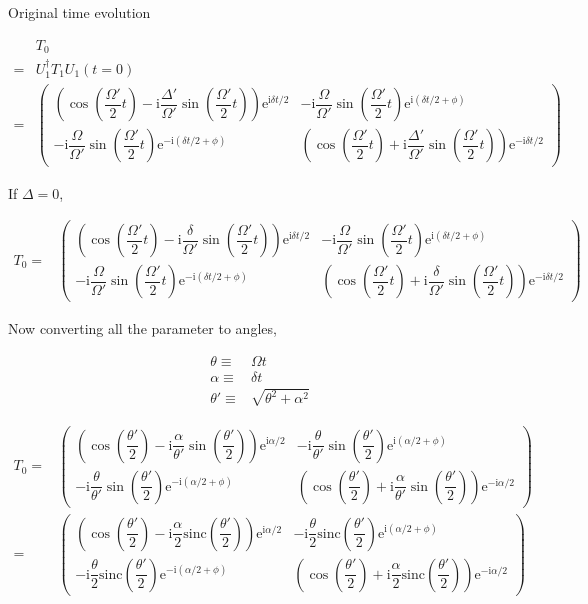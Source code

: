 \documentclass[10pt,fleqn]{article}
\newcommand{\ue}{\mathrm{e}}
\newcommand{\ui}{\mathrm{i}}
\newcommand{\eqar}[1]
{
  \begin{align*}
    #1
  \end{align*}
}
\newcommand{\paren}[1]{{\left({#1}\right)}}
\begin{document}
Original time evolution
\eqar{
  &T_0\\
  =&U_1^\dagger T_1 U_1(t=0)\\
  =&\begin{pmatrix}
    \paren{\cos\paren{\dfrac{\Omega'}{2}t}-\ui\dfrac{\Delta'}{\Omega'}\sin\paren{\dfrac{\Omega'}{2}t}}\ue^{\ui\delta t/2}
    &-\ui\dfrac{\Omega}{\Omega'}\sin\paren{\dfrac{\Omega'}{2}t}\ue^{\ui\paren{\delta t/2 + \phi}}\\
    -\ui\dfrac{\Omega}{\Omega'}\sin\paren{\dfrac{\Omega'}{2}t}\ue^{-\ui\paren{\delta t/2 + \phi}}
    &\paren{\cos\paren{\dfrac{\Omega'}{2}t}+\ui\dfrac{\Delta'}{\Omega'}\sin\paren{\dfrac{\Omega'}{2}t}}\ue^{-\ui\delta t/2}
  \end{pmatrix}
}

If $\Delta=0$,
\eqar{
  T_0=&\begin{pmatrix}
    \paren{\cos\paren{\dfrac{\Omega'}{2}t}-\ui\dfrac{\delta}{\Omega'}\sin\paren{\dfrac{\Omega'}{2}t}}\ue^{\ui\delta t/2}
    &-\ui\dfrac{\Omega}{\Omega'}\sin\paren{\dfrac{\Omega'}{2}t}\ue^{\ui\paren{\delta t/2 + \phi}}\\
    -\ui\dfrac{\Omega}{\Omega'}\sin\paren{\dfrac{\Omega'}{2}t}\ue^{-\ui\paren{\delta t/2 + \phi}}
    &\paren{\cos\paren{\dfrac{\Omega'}{2}t}+\ui\dfrac{\delta}{\Omega'}\sin\paren{\dfrac{\Omega'}{2}t}}\ue^{-\ui\delta t/2}
  \end{pmatrix}
}
Now converting all the parameter to angles,
\eqar{
  \theta\equiv&\Omega t\\
  \alpha\equiv&\delta t\\
  \theta'\equiv&\sqrt{\theta^2+\alpha^2}
}
\eqar{
  T_0=&\begin{pmatrix}
    \paren{\cos\paren{\dfrac{\theta'}{2}}-\ui\dfrac{\alpha}{\theta'}\sin\paren{\dfrac{\theta'}{2}}}\ue^{\ui\alpha/2}
    &-\ui\dfrac{\theta}{\theta'}\sin\paren{\dfrac{\theta'}{2}}\ue^{\ui\paren{\alpha/2 + \phi}}\\
    -\ui\dfrac{\theta}{\theta'}\sin\paren{\dfrac{\theta'}{2}}\ue^{-\ui\paren{\alpha/2 + \phi}}
    &\paren{\cos\paren{\dfrac{\theta'}{2}}+\ui\dfrac{\alpha}{\theta'}\sin\paren{\dfrac{\theta'}{2}}}\ue^{-\ui\alpha/2}
  \end{pmatrix}\\
  =&\begin{pmatrix}
    \paren{\cos\paren{\dfrac{\theta'}{2}}-\ui\dfrac{\alpha}{2}\mathrm{sinc}\paren{\dfrac{\theta'}{2}}}\ue^{\ui\alpha/2}
    &-\ui\dfrac{\theta}{2}\mathrm{sinc}\paren{\dfrac{\theta'}{2}}\ue^{\ui\paren{\alpha/2 + \phi}}\\
    -\ui\dfrac{\theta}{2}\mathrm{sinc}\paren{\dfrac{\theta'}{2}}\ue^{-\ui\paren{\alpha/2 + \phi}}
    &\paren{\cos\paren{\dfrac{\theta'}{2}}+\ui\dfrac{\alpha}{2}\mathrm{sinc}\paren{\dfrac{\theta'}{2}}}\ue^{-\ui\alpha/2}
  \end{pmatrix}
}
\end{document}
